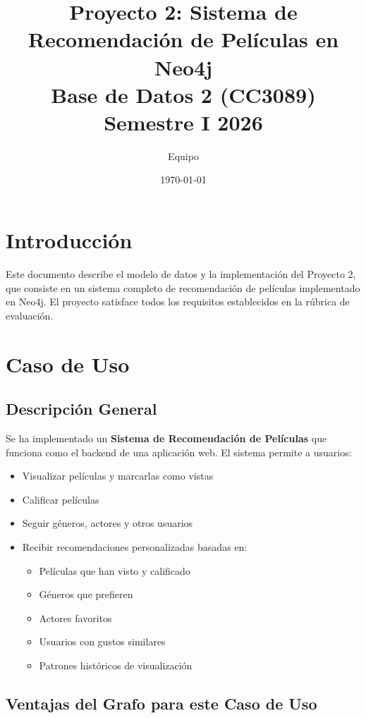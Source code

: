 \documentclass[12pt]{article}
\title{\textbf{Proyecto 2: Sistema de Recomendación de Películas en Neo4j} \\ 
       Base de Datos 2 (CC3089) \\ 
       Semestre I 2026}
\author{Equipo}
\date{\today}
\begin{document}
\maketitle

\tableofcontents
\newpage

\section{Introducción}

Este documento describe el modelo de datos y la implementación del Proyecto 2, que consiste en un sistema completo de recomendación de películas implementado en Neo4j. El proyecto satisface todos los requisitos establecidos en la rúbrica de evaluación.

\section{Caso de Uso}

\subsection{Descripción General}

Se ha implementado un \textbf{Sistema de Recomendación de Películas} que funciona como el backend de una aplicación web. El sistema permite a usuarios:

\begin{itemize}
    \item Visualizar películas y marcarlas como vistas
    \item Calificar películas
    \item Seguir géneros, actores y otros usuarios
    \item Recibir recomendaciones personalizadas basadas en:
    \begin{itemize}
        \item Películas que han visto y calificado
        \item Géneros que prefieren
        \item Actores favoritos
        \item Usuarios con gustos similares
        \item Patrones históricos de visualización
    \end{itemize}
\end{itemize}

\subsection{Ventajas del Grafo para este Caso de Uso}
\end{document}

